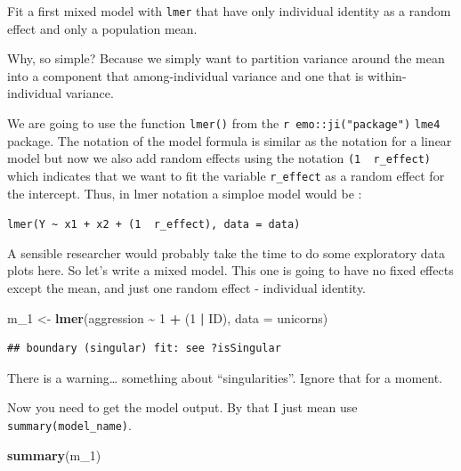 \documentclass[
  12pt,
]{book}
\makeatletter
\newenvironment{Shaded}{\begin{snugshade}}{\end{snugshade}}
\newcommand{\DataTypeTok}[1]{\textcolor[rgb]{0.13,0.29,0.53}{#1}}
\newcommand{\DecValTok}[1]{\textcolor[rgb]{0.00,0.00,0.81}{#1}}
\newcommand{\KeywordTok}[1]{\textcolor[rgb]{0.13,0.29,0.53}{\textbf{#1}}}
\newcommand{\NormalTok}[1]{#1}
\newcommand{\OperatorTok}[1]{\textcolor[rgb]{0.81,0.36,0.00}{\textbf{#1}}}
\newcommand{\StringTok}[1]{\textcolor[rgb]{0.31,0.60,0.02}{#1}}
\newenvironment{kframe}{%
\medskip{}
\setlength{\fboxsep}{.8em}
\def\at@end@of@kframe{}%
\ifinner\ifhmode%
 \def\at@end@of@kframe{\end{minipage}}%
 \begin{minipage}{\columnwidth}%
\fi\fi%
\def\FrameCommand##1{\hskip\@totalleftmargin \hskip-\fboxsep
\colorbox{incolor}{##1}\hskip-\fboxsep
    \hskip-\linewidth \hskip-\@totalleftmargin \hskip\columnwidth}%
\MakeFramed {\advance\hsize-\width
  \@totalleftmargin\z@ \linewidth\hsize
  \@setminipage}}%
{\par\unskip\endMakeFramed%
\at@end@of@kframe}
\newenvironment{rmdblock}[1]
 {
 \begin{itemize}
 \renewcommand{\labelitemi}{
   \raisebox{-.7\height}[0pt][0pt]{
     {\setkeys{Gin}{width=3em,keepaspectratio}\texttt{[image: images/icons/\#1]}}
   }
 }
 \begin{kframe}
 \setlength{\fboxsep}{1em}
 \item
 }
 {
 \end{kframe}
 \end{itemize}
 }
\newenvironment{rmdimportant}
  {\begin{rmdblock}{important}}
  {\end{rmdblock}}
\makeatother
\begin{document}
Fit a first mixed model with \texttt{lmer} that have only individual identity as a random effect and only a population mean.

Why, so simple? Because we simply want to partition variance around the mean into a component that among-individual variance and one that is within-individual variance.

\begin{rmdimportant}
We are going to use the function \texttt{lmer()} from the \texttt{r\ emo::ji("package")} \texttt{lme4} package. The notation of the model formula is similar as the notation for a linear model but now we also add random effects using the notation \texttt{(1\ \textbar{}\ r\_effect)} which indicates that we want to fit the variable \texttt{r\_effect} as a random effect for the intercept. Thus, in lmer notation a simploe model would be :

\texttt{lmer(Y\ \textasciitilde{}\ x1\ +\ x2\ +\ (1\ \textbar{}\ r\_effect),\ data\ =\ data)}
\end{rmdimportant}

A sensible researcher would probably take the time to do some exploratory data plots here. So let's write a mixed model. This one is going to have no fixed effects except the mean, and just one random effect - individual identity.

\begin{Shaded}
\begin{Highlighting}[]
\NormalTok{m\_}\DecValTok{1}\NormalTok{ \textless{}{-}}\StringTok{ }\KeywordTok{lmer}\NormalTok{(aggression }\OperatorTok{\textasciitilde{}}\StringTok{ }\DecValTok{1} \OperatorTok{+}\StringTok{ }\NormalTok{(}\DecValTok{1} \OperatorTok{|}\StringTok{ }\NormalTok{ID), }\DataTypeTok{data =}\NormalTok{ unicorns)}
\end{Highlighting}
\end{Shaded}

\begin{verbatim}
## boundary (singular) fit: see ?isSingular
\end{verbatim}

There is a warning\ldots{} something about ``singularities''. Ignore that for a moment.

Now you need to get the model output. By that I just mean use \texttt{summary(model\_name)}.

\begin{Shaded}
\begin{Highlighting}[]
\KeywordTok{summary}\NormalTok{(m\_}\DecValTok{1}\NormalTok{)}
\end{Highlighting}
\end{Shaded}
\end{document}
